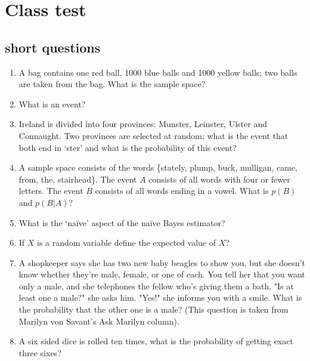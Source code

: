 \documentclass[11pt,a4paper]{scrartcl}
\begin{document}
\section*{Class test}

\subsection*{short questions}

\begin{enumerate}

\item A bag contains one red ball, 1000 blue balls and 1000 yellow balls; two balls are taken from the bag. What is the sample space?

\item What is an event?

\item Ireland is divided into four provinces: Munster, Leinster, Ulster and Connaught. Two provinces are selected at random; what is the event that both end in \lq{}ster\rq{} and what is the probability of this event?

\item A sample space consists of the words \{stately, plump, buck, mulligan, came, from, the, stairhead\}. The event $A$ consists of all words with four or fewer letters. The event $B$ consists of all words ending in a vowel. What is $p(B)$ and $p(B|A)$?

\item What is the \lq{}na\"{i}ve\rq{} aspect of the na\"{i}ve Bayes estimator?

\item If $X$ is a random variable define the expected value of $X$?

\item A shopkeeper says she has two new baby beagles to show you,
but she doesn't know whether they're male, female, or one of each. You
tell her that you want only a male, and she telephones the fellow
who's giving them a bath. "Is at least one a male?" she asks
him. "Yes!" she informs you with a smile. What is the probability that
the other one is a male?  (This question is taken from Marilyn von
Savant's Ask Marilyn column).

\item A six sided dice is rolled ten times, what is the probability of getting exact three sixes?

\end{enumerate}
  
\end{document}
